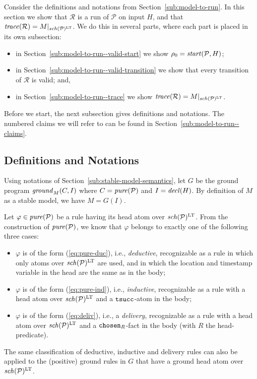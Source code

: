 \documentclass{tlp}
\newcommand{\ded}{\mathcal{P}}
\newcommand{\proj}[2]{#1|_{#2}}
\newcommand{\rl}{\varphi}
\newcommand{\schof}[1]{\fname{sch}(#1)}
\newcommand{\grp}[3]{\fname{ground}_{#1}(#2,#3)}
\newcommand{\toloct}[1]{#1^{\mathrm{LT}}}
\newcommand{\timesucc}{\pred{tsucc}}
\newcommand{\chosen}{\pred{chosen}}
\newcommand{\decl}[1]{\fname{decl}(#1)}
\newcommand{\pure}[1]{\fname{pure}(#1)}
\newcommand{\cnf}{\rho}
\newcommand{\cnfstart}[2]{\fname{\fname{start}}(#1,#2)}
\newcommand{\run}{\mathcal{R}}
\newcommand{\trace}[1]{\fname{trace}(#1)}
\newcommand{\grded}{G}
\begin{document}
\begin{appendix}
Consider the definitions and notations from Section~\ref{sub:model-to-run}.
In this section we show that $\run$ is a run of $\ded$ on input
$H$, and that $\trace{\run}=\proj M{\toloct{\schof{\ded}}}$. We
do this in several parts, where each part is placed in its own subsection: 
\begin{itemize}
\item in Section~\ref{sub:model-to-run--valid-start} we show $\cnf_{0}=\cnfstart{\ded}H$;
\item in Section~\ref{sub:model-to-run--valid-transition} we show that
every transition of $\run$ is valid; and,
\item in Section~\ref{sub:model-to-run--trace} we show $\trace{\run}=\proj M{\toloct{\schof{\ded}}}$.
\end{itemize}
Before we start, the next subsection gives definitions and notations.
The numbered claims we will refer to can be found in Section~\ref{sub:model-to-run--claims}.


\subsection{Definitions and Notations}

\label{sub:model-to-run-defs-notations}

\newcommand{\up}[1]{#1^{\blacktriangle}}


\newcommand{\duc}[2]{#1^{\mathrm{duc},#2}}


\newcommand{\ind}[1]{#1^{\mathrm{ind}}}


\newcommand{\deliv}[1]{#1^{\mathrm{deliv}}}




Using notations of Section~\ref{sub:stable-model-semantics},
let $\grded$ be the ground program $\grp MCI$ where $C=\pure{\ded}$
and $I=\decl H$. By definition of $M$ as a stable model, we have
$M=\grded(I)$.

Let $\rl\in\pure{\ded}$ be a rule having its head atom over $\toloct{\schof{\ded}}$.
From the construction of $\pure{\ded}$, we know that $\rl$ belongs
to exactly one of the following three cases:
\begin{itemize}
\item $\rl$ is of the form (\ref{eq:pure-duc}), i.e., \emph{deductive},
recognizable as a rule in which only atoms over $\toloct{\schof{\ded}}$
are used, and in which the location and timestamp variable in the
head are the same as in the body;
\item $\rl$ is of the form (\ref{eq:pure-ind}), i.e., \emph{inductive},
recognizable as a rule with a head atom over $\toloct{\schof{\ded}}$
and a $\timesucc$-atom in the body;
\item $\rl$ is of the form (\ref{eq:deliv}), i.e., a \emph{delivery},
recognizable as a rule with a head atom over $\toloct{\schof{\ded}}$
and a $\chosen_{R}$-fact in the body (with $R$ the head-predicate).
\end{itemize}
The same classification of deductive, inductive and delivery rules
can also be applied to the (positive) ground rules in $\grded$ that
have a ground head atom over $\toloct{\schof{\ded}}$. 


\end{appendix}
\end{document}
